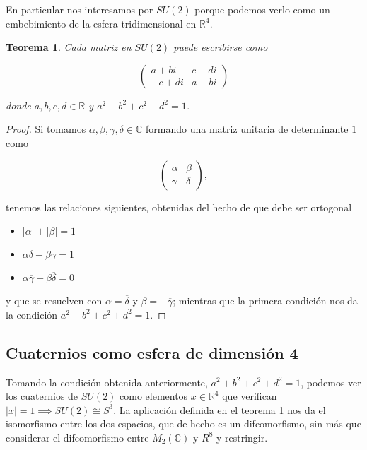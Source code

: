 \documentclass{article}
\theoremstyle{plain}
\newtheorem{theorem}{Teorema}
\theoremstyle{definition}
\theoremstyle{remark}
\begin{document}
En particular nos interesamos por $SU(2)$ porque podemos verlo como un embebimiento de la
esfera tridimensional en $\mathbb{R}^4$.

\begin{theorem}
\label{su2}
  Cada matriz en $SU(2)$ puede escribirse como

  \[\begin{pmatrix}
      a+bi & c+di \\
      -c+di & a-bi
    \end{pmatrix}\]

  donde $a,b,c,d \in \mathbb{R}$ y $a^2+b^2+c^2+d^2 = 1$.
\end{theorem}
\begin{proof}
  Si tomamos $\alpha,\beta,\gamma,\delta \in \mathbb{C}$ formando una matriz unitaria de
  determinante $1$ como

    \[\begin{pmatrix}
      \alpha & \beta \\
      \gamma & \delta
    \end{pmatrix},\]

  tenemos las relaciones siguientes, obtenidas del hecho de que debe ser ortogonal

  \begin{itemize}
    \item $|\alpha|+|\beta| = 1$
    \item $\alpha\delta-\beta\gamma = 1$
    \item $\alpha\overline{\gamma} + \beta\overline{\delta} = 0$
  \end{itemize}

  y que se resuelven con $\alpha = \overline{\delta}$ y
  $\beta = -\overline{\gamma}$; mientras que la primera condición
  nos da la condición $a^2+b^2+c^2+d^2 = 1$.
\end{proof}


\subsection{Cuaternios como esfera de dimensión 4}

Tomando la condición obtenida anteriormente, $a^2+b^2+c^2+d^2 = 1$, podemos ver los cuaternios de $SU(2)$ como elementos $x \in
\mathbb R^4$ que verifican $\left|x\right| = 1 \implies SU(2) \cong S^3$. La aplicación definida en el teorema \ref{su2} nos da
el isomorfismo entre los dos espacios, que de hecho es un difeomorfismo, sin más que considerar el difeomorfismo entre $M_2(\mathbb C)$
y $R^8$ y restringir.
\end{document}
